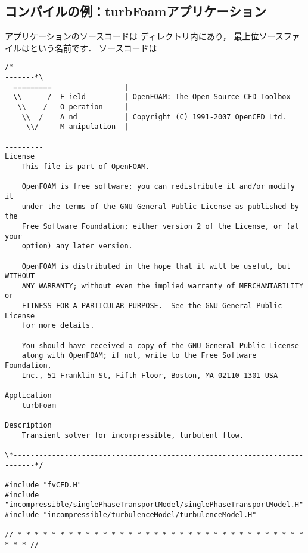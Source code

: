 \subsection{コンパイルの例：turbFoamアプリケーション}
\label{ssec:3.2.4}
アプリケーションのソースコードは
ディレクトリ内にあり，
最上位ソースファイルはという名前です．
ソースコードは
\begin{OFfile}
\begin{verbatim}
/*---------------------------------------------------------------------------*\
  =========                 |
  \\      /  F ield         | OpenFOAM: The Open Source CFD Toolbox
   \\    /   O peration     |
    \\  /    A nd           | Copyright (C) 1991-2007 OpenCFD Ltd.
     \\/     M anipulation  |
-------------------------------------------------------------------------------
License
    This file is part of OpenFOAM.

    OpenFOAM is free software; you can redistribute it and/or modify it
    under the terms of the GNU General Public License as published by the
    Free Software Foundation; either version 2 of the License, or (at your
    option) any later version.

    OpenFOAM is distributed in the hope that it will be useful, but WITHOUT
    ANY WARRANTY; without even the implied warranty of MERCHANTABILITY or
    FITNESS FOR A PARTICULAR PURPOSE.  See the GNU General Public License
    for more details.

    You should have received a copy of the GNU General Public License
    along with OpenFOAM; if not, write to the Free Software Foundation,
    Inc., 51 Franklin St, Fifth Floor, Boston, MA 02110-1301 USA

Application
    turbFoam

Description
    Transient solver for incompressible, turbulent flow.

\*---------------------------------------------------------------------------*/

#include "fvCFD.H"
#include "incompressible/singlePhaseTransportModel/singlePhaseTransportModel.H"
#include "incompressible/turbulenceModel/turbulenceModel.H"

// * * * * * * * * * * * * * * * * * * * * * * * * * * * * * * * * * * * * * //


\end{verbatim}
\end{OFfile}
